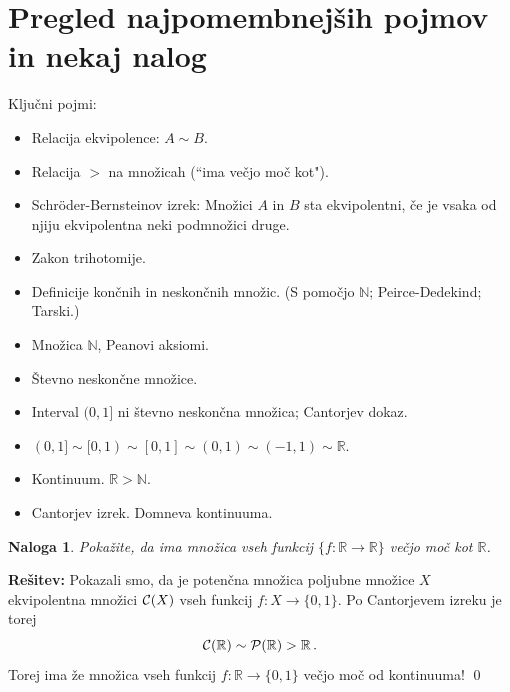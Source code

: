\documentclass[11pt,paper=b5,footinclude,headinclude]{scrbook} %
\newtheorem*{problem}{Naloga}
\begin{document}
\section{Pregled najpomembnejših pojmov in nekaj nalog}

Ključni pojmi:
\begin{itemize}
\item Relacija ekvipolence: $A\sim B$.
\item Relacija $>$ na množicah (``ima večjo moč kot").
\item Schröder-Bernsteinov izrek: Množici $A$ in $B$ sta ekvipolentni, če je vsaka od
njiju ekvipolentna neki podmnožici druge.
\item Zakon trihotomije.
\item Definicije končnih in neskončnih množic. (S pomočjo $\mathbb N$; Peirce-Dedekind; Tarski.)
\item Množica $\mathbb N$, Peanovi aksiomi.
\item Števno neskončne množice.
\item Interval $(0,1]$ ni števno neskončna množica; Cantorjev dokaz.
\item $(0,1]\sim [0,1)\sim [0,1]\sim (0,1)\sim (-1,1)\sim \mathbb{R}$.
\item Kontinuum. $\mathbb{R}>\mathbb{N}$.
\item Cantorjev izrek. Domneva kontinuuma.
\end{itemize}

\begin{problem}
Pokažite, da ima množica vseh funkcij
$\{f:\mathbb{R}\to \mathbb{R}\}$ večjo moč kot $\mathbb{R}$.
\end{problem}


\bigskip
\textbf{Rešitev:} Pokazali smo, da je potenčna množica poljubne množice $X$
ekvipolentna množici ${\cal C}(X)$ vseh funkcij $f:X\to \{0,1\}$.
Po Cantorjevem izreku je torej
$${\cal C}(\mathbb{R})\sim {\cal P}(\mathbb{R})>\mathbb{R}\,.$$
Torej ima že množica vseh funkcij $f:\mathbb{R}\to \{0,1\}$ večjo moč od kontinuuma!
\qed


%
%
\end{document}

